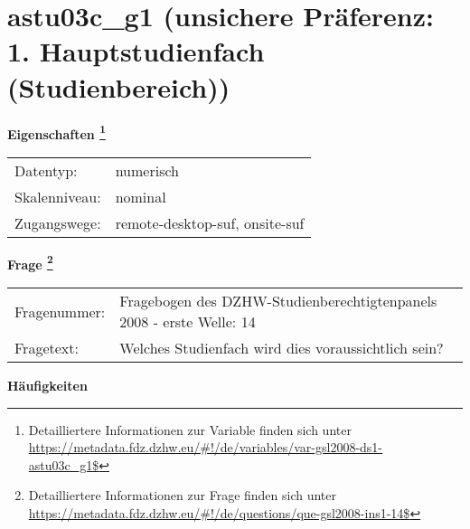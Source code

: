 
    \setcounter{footnote}{0}

    \vspace*{-1.8cm}
	\section{astu03c\_g1 (unsichere Präferenz: 1. Hauptstudienfach (Studienbereich))}
	\label{section:astu03c_g1}



    \vspace*{0.5cm}
    \noindent\textbf{Eigenschaften
	\footnote{Detailliertere Informationen zur Variable finden sich unter
		\url{https://metadata.fdz.dzhw.eu/\#!/de/variables/var-gsl2008-ds1-astu03c_g1$}}}\\
	\begin{tabularx}{\hsize}{@{}lX}
	Datentyp: & numerisch \\
	Skalenniveau: & nominal \\
	Zugangswege: &
	  remote-desktop-suf, 
	  onsite-suf
 \\
    \end{tabularx}



				\vspace*{0.5cm}
                \noindent\textbf{Frage
	                \footnote{Detailliertere Informationen zur Frage finden sich unter
		              \url{https://metadata.fdz.dzhw.eu/\#!/de/questions/que-gsl2008-ins1-14$}}}\\
				\begin{tabularx}{\hsize}{@{}lX}
					Fragenummer: &
					  Fragebogen des DZHW-Studienberechtigtenpanels 2008 - erste Welle:
					  14
 \\
					Fragetext: & Welches Studienfach wird dies voraussichtlich sein? \\
				\end{tabularx}





        		\vspace*{0.5cm}
                \noindent\textbf{Häufigkeiten}


